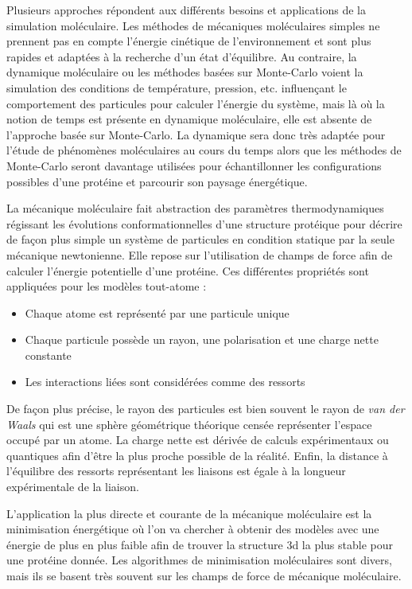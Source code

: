 Plusieurs approches répondent aux différents besoins et applications de la simulation moléculaire. 
Les méthodes de mécaniques moléculaires simples ne prennent pas en compte l'énergie cinétique de l'environnement et sont plus rapides et adaptées à la recherche d'un état d'équilibre. Au contraire, la dynamique moléculaire ou les méthodes basées sur Monte-Carlo voient la simulation des conditions de température, pression, etc. influençant le comportement des particules pour calculer l'énergie du système, mais là où la notion de temps est présente en dynamique moléculaire, elle est absente de l'approche basée sur Monte-Carlo. La dynamique sera donc très adaptée pour l'étude de phénomènes moléculaires au cours du temps alors que les méthodes de Monte-Carlo seront davantage utilisées pour échantillonner les configurations possibles d'une protéine et parcourir son paysage énergétique.



La mécanique moléculaire fait abstraction des paramètres thermodynamiques régissant les évolutions conformationnelles d'une structure protéique pour décrire de façon plus simple un système de particules en condition statique par la seule mécanique newtonienne. Elle repose sur l'utilisation de champs de force afin de calculer l'énergie potentielle d'une protéine. Ces différentes propriétés sont appliquées pour les modèles tout-atome :

\begin{itemize}
  \item Chaque atome est représenté par une particule unique
  \item Chaque particule possède un rayon, une polarisation et une charge nette constante
  \item Les interactions liées sont considérées comme des ressorts 
\end{itemize}

De façon plus précise, le rayon des particules est bien souvent le rayon de \textit{van der Waals} qui est une sphère géométrique théorique censée représenter l'espace occupé par un atome. La charge nette est dérivée de calculs expérimentaux ou quantiques afin d'être la plus proche possible de la réalité. Enfin, la distance à l'équilibre des ressorts représentant les liaisons est égale à la longueur expérimentale de la liaison.

L'application la plus directe et courante de la mécanique moléculaire est la minimisation énergétique où l'on va chercher à obtenir des modèles avec une énergie de plus en plus faible afin de trouver la structure 3d la plus stable pour une protéine donnée. Les algorithmes de minimisation moléculaires sont divers, mais ils se basent très souvent sur les champs de force de mécanique moléculaire.

